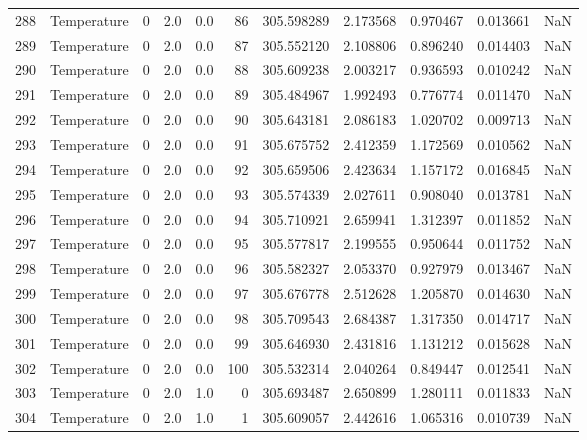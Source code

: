\begin{tabular}{llrrrrrrrrr}
288 &  Temperature &       0 &  2.0 &  0.0 &   86 &  305.598289 &  2.173568 &  0.970467 &   0.013661 &      NaN \\
289 &  Temperature &       0 &  2.0 &  0.0 &   87 &  305.552120 &  2.108806 &  0.896240 &   0.014403 &      NaN \\
290 &  Temperature &       0 &  2.0 &  0.0 &   88 &  305.609238 &  2.003217 &  0.936593 &   0.010242 &      NaN \\
291 &  Temperature &       0 &  2.0 &  0.0 &   89 &  305.484967 &  1.992493 &  0.776774 &   0.011470 &      NaN \\
292 &  Temperature &       0 &  2.0 &  0.0 &   90 &  305.643181 &  2.086183 &  1.020702 &   0.009713 &      NaN \\
293 &  Temperature &       0 &  2.0 &  0.0 &   91 &  305.675752 &  2.412359 &  1.172569 &   0.010562 &      NaN \\
294 &  Temperature &       0 &  2.0 &  0.0 &   92 &  305.659506 &  2.423634 &  1.157172 &   0.016845 &      NaN \\
295 &  Temperature &       0 &  2.0 &  0.0 &   93 &  305.574339 &  2.027611 &  0.908040 &   0.013781 &      NaN \\
296 &  Temperature &       0 &  2.0 &  0.0 &   94 &  305.710921 &  2.659941 &  1.312397 &   0.011852 &      NaN \\
297 &  Temperature &       0 &  2.0 &  0.0 &   95 &  305.577817 &  2.199555 &  0.950644 &   0.011752 &      NaN \\
298 &  Temperature &       0 &  2.0 &  0.0 &   96 &  305.582327 &  2.053370 &  0.927979 &   0.013467 &      NaN \\
299 &  Temperature &       0 &  2.0 &  0.0 &   97 &  305.676778 &  2.512628 &  1.205870 &   0.014630 &      NaN \\
300 &  Temperature &       0 &  2.0 &  0.0 &   98 &  305.709543 &  2.684387 &  1.317350 &   0.014717 &      NaN \\
301 &  Temperature &       0 &  2.0 &  0.0 &   99 &  305.646930 &  2.431816 &  1.131212 &   0.015628 &      NaN \\
302 &  Temperature &       0 &  2.0 &  0.0 &  100 &  305.532314 &  2.040264 &  0.849447 &   0.012541 &      NaN \\
303 &  Temperature &       0 &  2.0 &  1.0 &    0 &  305.693487 &  2.650899 &  1.280111 &   0.011833 &      NaN \\
304 &  Temperature &       0 &  2.0 &  1.0 &    1 &  305.609057 &  2.442616 &  1.065316 &   0.010739 &      NaN \\

\end{tabular}
